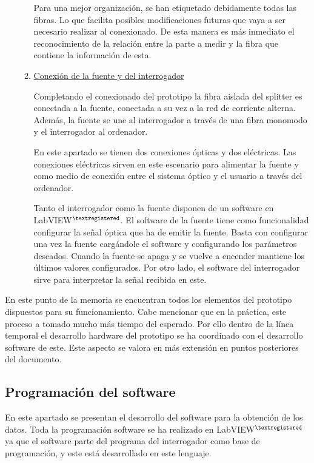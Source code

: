 \begin{itemize}
\begin{enumerate}
	
	Para una mejor organización, se han etiquetado debidamente todas las fibras. Lo que facilita posibles modificaciones futuras que vaya a ser necesario realizar al conexionado. De esta manera es más inmediato el reconocimiento de la relación entre la parte a medir y la fibra que contiene la información de esta.
		
	
	\item \underline{Conexión de la fuente y del interrogador}
	
	Completando el conexionado del prototipo la fibra aislada del splitter es conectada a la fuente, conectada a su vez a la red de corriente alterna. Además, la fuente se une al interrogador a través de una fibra monomodo y el interrogador al ordenador. 
	
	En este apartado se tienen dos conexiones ópticas y dos eléctricas. Las conexiones eléctricas sirven en este escenario para alimentar la fuente y como medio de conexión entre el sistema óptico y el usuario a través del ordenador. 
	
	Tanto el interrogador como la fuente disponen de un software en LabVIEW$^{\textregistered}$. El software de la fuente tiene como funcionalidad configurar la señal óptica que ha de emitir la fuente. Basta con configurar una vez la fuente cargándole el software y configurando los parámetros deseados. Cuando la fuente se apaga y se vuelve a encender mantiene los últimos valores configurados. Por otro lado, el software del interrogador sirve para interpretar la señal recibida en este.
	
		
	\end{enumerate}
	 
	
\end{itemize}

En este punto de la memoria se encuentran todos los elementos del prototipo dispuestos para su funcionamiento. Cabe mencionar que en la práctica, este proceso a tomado mucho más tiempo del esperado. Por ello dentro de la línea temporal el desarrollo hardware del prototipo se ha coordinado con el desarrollo software de este. Este aspecto se valora en más extensión en puntos posteriores del documento. 



\subsection{Programación del software}
\label{sec:programacion}

En este apartado se presentan el desarrollo del software para la obtención de los datos. Toda la programación software se ha realizado en LabVIEW$^{\textregistered}$ ya que el software parte del programa del interrogador como base de programación, y este está desarrollado en este lenguaje. 

